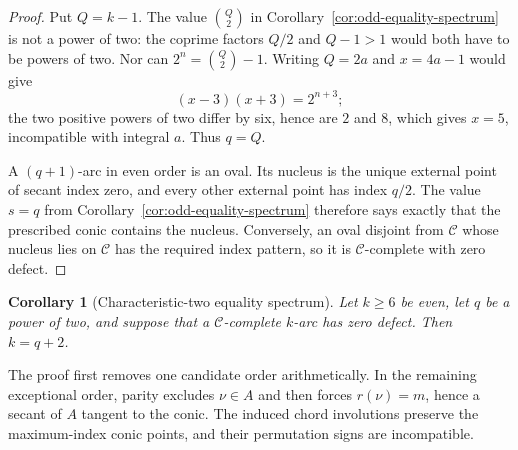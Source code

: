 \documentclass[11pt]{article}
\newtheorem{corollary}[theorem]{Corollary}
\theoremstyle{definition}
\theoremstyle{remark}
\newcommand{\cC}{\mathcal{C}}
\begin{document}
\begin{proof}
Put $Q=k-1$.  The value $\binom Q2$ in
Corollary~\ref{cor:odd-equality-spectrum} is not a power of two: the
coprime factors $Q/2$ and $Q-1>1$ would both have to be powers of two.
Nor can $2^n=\binom Q2-1$.  Writing $Q=2a$ and $x=4a-1$ would give
\[
 (x-3)(x+3)=2^{n+3};
\]
the two positive powers of two differ by six, hence are $2$ and $8$,
which gives $x=5$, incompatible with integral $a$.  Thus $q=Q$.

A $(q+1)$-arc in even order is an oval.  Its nucleus is the unique
external point of secant index zero, and every other external point has
index $q/2$.  The value $s=q$ from
Corollary~\ref{cor:odd-equality-spectrum} therefore says exactly that the
prescribed conic contains the nucleus.  Conversely, an oval disjoint from
$\cC$ whose nucleus lies on $\cC$ has the required index pattern, so it is
$\cC$-complete with zero defect.
\end{proof}

\begin{corollary}[Characteristic-two equality spectrum]
\label{cor:characteristic-two-equality-spectrum}
Let \(k\ge6\) be even, let \(q\) be a power of two, and suppose that a
\(\cC\)-complete \(k\)-arc has zero defect.  Then \(k=q+2\).
\end{corollary}

The proof first removes one candidate order arithmetically.  In the remaining
exceptional order, parity excludes \(\nu\in A\) and then forces
\(r(\nu)=m\), hence a secant of \(A\) tangent to the conic.  The induced
chord involutions preserve the maximum-index conic points, and their
permutation signs are incompatible.
\end{document}
